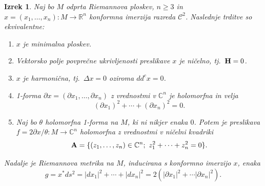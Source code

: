 \documentclass[12pt,a4paper,twoside]{article}
\theoremstyle{definition} %
\theoremstyle{plain} %
\newtheorem{izrek}[definicija]{Izrek}
\numberwithin{equation}{section}  %
\newcommand{\R}{\mathbb R}
\newcommand{\C}{\mathbb C}
\begin{document}
\begin{izrek} \label{izr:ekviv-min-ploskev}
Naj bo $M$ odprta Riemannova ploskev, $n \geq 3$ in $x = (x_1, \dots , x_n) \colon M \to \R^{n}$ konformna imerzija razreda $\mathcal{C}^2$. Naslednje trditve so ekvivalentne:
\begin{enumerate}
	\item $x$ je minimalna ploskev.
	\item Vektorsko polje povprečne ukrivljenosti preslikave $x$ je ničelno, tj.~$\textbf{\textup{H}} = 0$.
	\item $x$ je harmonična, tj.~$\Delta{x} = 0$ oziroma $dd^{c}x = 0$.
	\item 1-forma $ \partial{x} = (\partial{x_1}, \dots , \partial{x_n})$ z vrednostmi v $\C^{n}$ je holomorfna in velja
			\begin{equation} \label{eq:partialx^2 = 0}
			(\partial{x_1})^2 + \cdots + (\partial{x_n})^2 = 0.
			\end{equation}
	\item Naj bo $\theta$ holomorfna 1-forma na $M$, ki ni nikjer enaka $0$. Potem je preslikava $f = 2\partial{x} / \theta \colon M \to \C^{n}$ holomorfna z 				vrednostmi v ničelni kvadriki
			\begin{equation} \label{ničelna-kvadrika}		
			\textbf{\textup{A}} = \{ (z_1, \dots , z_n) \in \C^{n} ; \ z_{1}^{2} + \cdots + z_{n}^{2} = 0 \}.
			\end{equation}	
\end{enumerate}
Nadalje je Riemannova metrika na $M$, inducirana s konformno imerzijo $x$, enaka
	\begin{equation} \label{eq:|dx|^2=2|partialx|^2}
	g = x^{*} ds^2 = |dx_1|^2 + \cdots + |dx_n|^2 = 2 (|\partial{x_1}|^2 + \cdots |\partial{x_n}|^2).
	\end{equation}			
\end{izrek}
\end{document}
